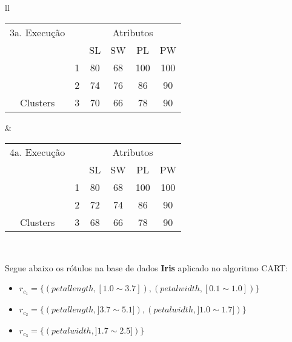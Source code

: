 \begin{table}[!h]
\begin{tabular}{ll}
   \small\addtolength{\tabcolsep}{-1pt}
     \begin{tabular}{|cl|c|c|c|c|}
        \hline \hline
         3a. Execução           &   & \multicolumn{4}{c|}{Atributos}                                               \\ \cline{3-6} 
       \multicolumn{1}{|l}{}                             &   & SL   & SW     & PL    & PW      \\ \hline
        \multicolumn{1}{|c|}{}                           & 1 & 80 & 68   & 100  & 100       \\ \cline{2-6} 
        \multicolumn{1}{|c|}{}                           & 2 & 74 & 76   & 86  &  90    \\ \cline{2-6} 
        \multicolumn{1}{|c|}{\multirow{-3}{*}{Clusters}} & 3 & 70 & 66   & 78  &   90   \\ \hline
      \end{tabular}
    
    &
    
 \small\addtolength{\tabcolsep}{-1pt}
     \begin{tabular}{|cl|c|c|c|c|}
        \hline \hline
        4a. Execução      &   & \multicolumn{4}{c|}{Atributos}                                               \\ \cline{3-6} 
       \multicolumn{1}{|l}{}                             &   & SL   & SW     & PL    & PW      \\ \hline
        \multicolumn{1}{|c|}{}                           & 1 & 80 & 68   & 100  &   100     \\ \cline{2-6} 
        \multicolumn{1}{|c|}{}                           & 2 & 72 & 74   & 86  &   90   \\ \cline{2-6} 
        \multicolumn{1}{|c|}{\multirow{-3}{*}{Clusters}} & 3 & 68 & 66   & 78  & 90     \\ \hline
      \end{tabular}
   \\
 
 \end{tabular}
 \label{tab:execucoes:iris:cart}
\end{table}


Segue abaixo os rótulos na base de dados \textbf{Iris} aplicado no algoritmo CART:
\begin{itemize}[noitemsep]
 \item ${r_{c_1}=\{ (petallength, [ 1.0 \sim 3.7]), (petalwidth,[ 0.1 \sim 1.0 ] ) \} }$  
 \item ${r_{c_2}=\{ (petallength, ] 3.7 \sim 5.1]), (petalwidth,] 1.0 \sim 1.7 ] )\} }$
 \item ${r_{c_3}=\{ (petalwidth, ] 1.7 \sim 2.5 ]) \} }$
\end{itemize}


